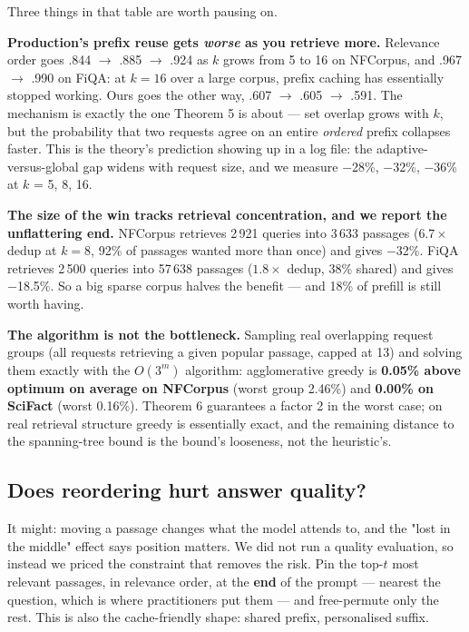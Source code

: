 \documentclass[11pt]{article}
\theoremstyle{plain}
\begin{document}
Three things in that table are worth pausing on.

\textbf{Production's prefix reuse gets \emph{worse} as you retrieve more.} Relevance order goes .844 $\to$ .885 $\to$ .924 as $k$ grows from 5 to 16 on NFCorpus, and .967 $\to$ .990 on FiQA: at $k=16$ over a large corpus, prefix caching has essentially stopped working. Ours goes the other way, .607 $\to$ .605 $\to$ .591. The mechanism is exactly the one Theorem 5 is about --- set overlap grows with $k$, but the probability that two requests agree on an entire \emph{ordered} prefix collapses faster. This is the theory's prediction showing up in a log file: the adaptive-versus-global gap widens with request size, and we measure $-$28\%, $-$32\%, $-$36\% at $k$ = 5, 8, 16.

\textbf{The size of the win tracks retrieval concentration, and we report the unflattering end.} NFCorpus retrieves 2\,921 queries into 3\,633 passages ($6.7\times$ dedup at $k=8$, 92\% of passages wanted more than once) and gives $-$32\%. FiQA retrieves 2\,500 queries into 57\,638 passages ($1.8\times$ dedup, 38\% shared) and gives $-$18.5\%. So a big sparse corpus halves the benefit --- and 18\% of prefill is still worth having.

\textbf{The algorithm is not the bottleneck.} Sampling real overlapping request groups (all requests retrieving a given popular passage, capped at 13) and solving them exactly with the $O(3^m)$ algorithm: agglomerative greedy is \textbf{0.05\% above optimum on average on NFCorpus} (worst group 2.46\%) and \textbf{0.00\% on SciFact} (worst 0.16\%). Theorem 6 guarantees a factor 2 in the worst case; on real retrieval structure greedy is essentially exact, and the remaining distance to the spanning-tree bound is the bound's looseness, not the heuristic's.

\subsection{Does reordering hurt answer quality?}

It might: moving a passage changes what the model attends to, and the "lost in the middle" effect says position matters. We did not run a quality evaluation, so instead we priced the constraint that removes the risk. Pin the top-$t$ most relevant passages, in relevance order, at the \textbf{end} of the prompt --- nearest the question, which is where practitioners put them --- and free-permute only the rest. This is also the cache-friendly shape: shared prefix, personalised suffix.
\end{document}
